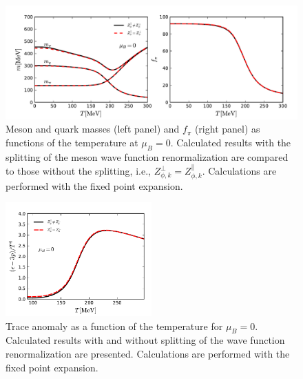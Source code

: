 \documentclass[%
reprint,
superscriptaddress,
showpacs,preprintnumbers,
 amsmath,amssymb,
 aps,
prd,
]{revtex4-1}
\begin{document}
%
\begin{figure}[t]
\includegraphics[width=1\textwidth]{mfpi}
\caption{Meson and quark masses (left panel) and $f_\pi$ (right panel) as functions of the temperature at $\mu_B=0$. Calculated results with the splitting of the meson wave function renormalization are compared to those without the splitting, i.e., $Z_{\phi,k}^{\perp}=Z_{\phi,k}^{\parallel}$. Calculations are performed with the fixed point expansion.}\label{fig:mfpi}
\end{figure}
%

%
\begin{figure}[t]
\includegraphics[width=0.5\textwidth]{trace}
\caption{Trace anomaly as a function of the temperature for $\mu_B=0$. Calculated results with and without splitting of the wave function renormalization are presented. Calculations are performed with the fixed point expansion.}\label{fig:trace}
\end{figure}
%
\end{document}
